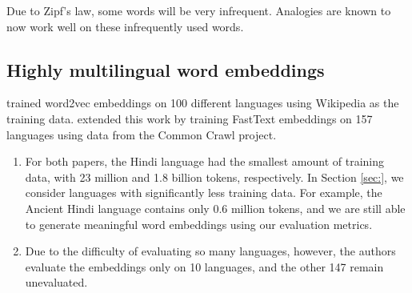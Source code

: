 \documentclass[11pt,a4paper]{article}
\begin{document}
Due to Zipf's law, some words will be very infrequent.
Analogies are known to now work well on these infrequently used words.

\subsection{Highly multilingual word embeddings}
\citet{al2013polyglot} trained word2vec embeddings on 100 different languages using Wikipedia as the training data.
\citet{grave2018learning} extended this work by training FastText embeddings on 157 languages using data from the Common Crawl project.
\begin{enumerate}
\item
For both papers, the Hindi language had the smallest amount of training data,
with 23 million and 1.8 billion tokens, respectively.
In Section \ref{sec:}, we consider languages with significantly less training data.
For example, the Ancient Hindi language contains only 0.6 million tokens,
and we are still able to generate meaningful word embeddings using our evaluation metrics.

\item
Due to the difficulty of evaluating so many languages, however, the authors evaluate the embeddings only on 10 languages,
and the other 147 remain unevaluated.

\end{enumerate}

%
%

\end{document}
